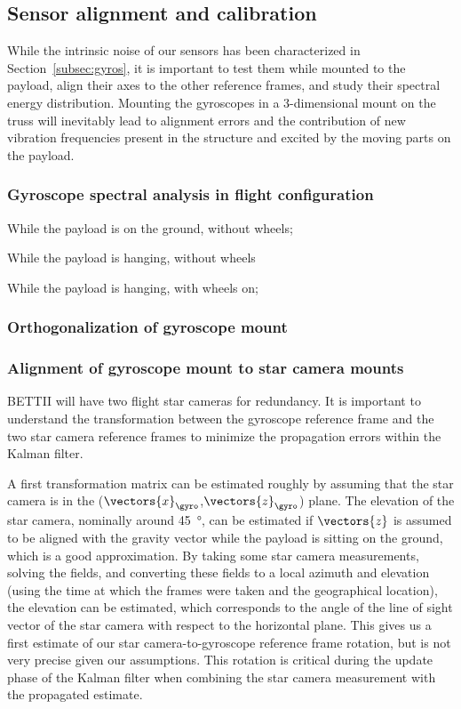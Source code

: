 \subsection{Sensor alignment and calibration}
While the intrinsic noise of our sensors has been characterized in Section~\ref{subsec:gyros}, it is important to test them while mounted to the payload, align their axes to the other reference frames, and study their spectral energy distribution. Mounting the gyroscopes in a 3-dimensional mount on the truss will inevitably lead to alignment errors and the contribution of new vibration frequencies present in the structure and excited by the moving parts on the payload.


\subsubsection{Gyroscope spectral analysis in flight configuration}

While the payload is on the ground, without wheels;

While the payload is hanging, without wheels

While the payload is hanging, with wheels on;

\subsubsection{Orthogonalization of gyroscope mount}
\label{ap:gyroOrth}
\subsubsection{Alignment of gyroscope mount to star camera mounts}

BETTII will have two flight star cameras for redundancy. It is important to understand the transformation between the gyroscope reference frame and the two star camera reference frames to minimize the propagation errors within the Kalman filter. 

A first transformation matrix can be estimated roughly by assuming that the star camera is in the ($\vectors{x}_\gyro$,$\vectors{z}_\gyro$) plane. The elevation of the star camera, nominally around \SI{45}{\degree}, can be estimated if $\vectors{z}$ is assumed to be aligned with the gravity vector while the payload is sitting on the ground, which is a good approximation. By taking some star camera measurements, solving the fields, and converting these fields to a local azimuth and elevation (using the time at which the frames were taken and the geographical location), the elevation can be estimated, which corresponds to the angle of the line of sight vector of the star camera with respect to the horizontal plane. This gives us a first estimate of our star camera-to-gyroscope reference frame rotation, but is not very precise given our assumptions. This rotation is critical during the update phase of the Kalman filter when combining the star camera measurement with the propagated estimate.

